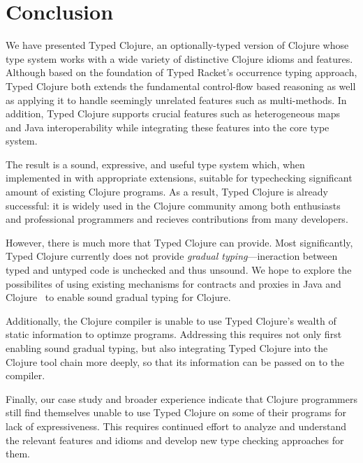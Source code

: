 \section{Conclusion}
\label{sec:conclusion}

We have presented Typed Clojure, an optionally-typed version of
Clojure whose type system works with a wide variety of distinctive
Clojure idioms and features. Although based on the foundation of Typed
Racket's occurrence typing approach, Typed Clojure both extends the
fundamental control-flow based reasoning as well as applying it to
handle seemingly unrelated features such as multi-methods. In
addition, Typed Clojure supports crucial features such as heterogeneous
maps and Java interoperability while integrating these features into
the core type system.

The result is a sound, expressive, and useful type system which, when
implemented in \coretyped with appropriate extensions, suitable for
typechecking significant amount of existing Clojure programs.
%
As a result, Typed Clojure is already successful: it is widely used in
the Clojure community among both enthusiasts and professional
programmers and recieves contributions from many developers.

However, there is much more that Typed Clojure can provide. Most
significantly, Typed Clojure currently does not provide \emph{gradual
  typing}---ineraction between typed and untyped code is unchecked and
thus unsound. We hope to explore the possibilites of using existing
mechanisms for contracts and proxies in Java and
Clojure~\cite{some-stuff} to enable sound gradual typing for Clojure.

Additionally, the Clojure compiler is unable to use Typed Clojure's
wealth of static information to optimze programs. Addressing this
requires not only first enabling sound gradual typing, but also
integrating Typed Clojure into the Clojure tool chain more deeply, so
that its information can be passed on to the compiler. 

Finally, our case study and broader experience indicate that Clojure
programmers still find themselves unable to use Typed Clojure on some
of their programs for lack of expressiveness. This requires continued
effort to analyze and understand the relevant features and idioms and
develop new type checking approaches for them.
